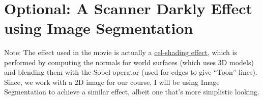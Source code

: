 \documentclass[11pt]{article}
\begin{document}
    \begin{center}
    \end{center}
    { \hspace*{\fill} \\}
    
    \hypertarget{optional-a-scanner-darkly-effect-using-image-segmentation}{%
\section{Optional: A Scanner Darkly Effect using Image
Segmentation}\label{optional-a-scanner-darkly-effect-using-image-segmentation}}

    Note: The effect used in the movie is actually a
\href{https://www.wikiwand.com/en/Cel_shading}{cel-shading effect},
which is performed by computing the normals for world surfaces (which
uses 3D models) and blending them with the Sobel operator (used for
edges to give ``Toon''-lines). Since, we work with a 2D image for our
course, I will be using Image Segmentation to achieve a similar effect,
albeit one that's more simplistic looking.
\end{document}
